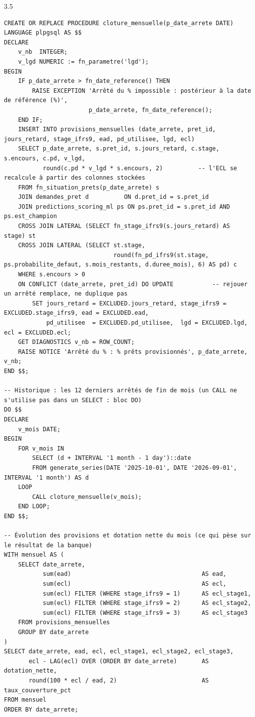 \begin{correction}{3.5}
\begin{lstlisting}[style=long]
CREATE OR REPLACE PROCEDURE cloture_mensuelle(p_date_arrete DATE)
LANGUAGE plpgsql AS $$
DECLARE
    v_nb  INTEGER;
    v_lgd NUMERIC := fn_parametre('lgd');
BEGIN
    IF p_date_arrete > fn_date_reference() THEN
        RAISE EXCEPTION 'Arrêté du % impossible : postérieur à la date de référence (%)',
                        p_date_arrete, fn_date_reference();
    END IF;
    INSERT INTO provisions_mensuelles (date_arrete, pret_id, jours_retard, stage_ifrs9, ead, pd_utilisee, lgd, ecl)
    SELECT p_date_arrete, s.pret_id, s.jours_retard, c.stage, s.encours, c.pd, v_lgd,
           round(c.pd * v_lgd * s.encours, 2)          -- l'ECL se recalcule à partir des colonnes stockées
    FROM fn_situation_prets(p_date_arrete) s
    JOIN demandes_pret d          ON d.pret_id = s.pret_id
    JOIN predictions_scoring_ml ps ON ps.pret_id = s.pret_id AND ps.est_champion
    CROSS JOIN LATERAL (SELECT fn_stage_ifrs9(s.jours_retard) AS stage) st
    CROSS JOIN LATERAL (SELECT st.stage,
                               round(fn_pd_ifrs9(st.stage, ps.probabilite_defaut, s.mois_restants, d.duree_mois), 6) AS pd) c
    WHERE s.encours > 0
    ON CONFLICT (date_arrete, pret_id) DO UPDATE           -- rejouer un arrêté remplace, ne duplique pas
        SET jours_retard = EXCLUDED.jours_retard, stage_ifrs9 = EXCLUDED.stage_ifrs9, ead = EXCLUDED.ead,
            pd_utilisee  = EXCLUDED.pd_utilisee,  lgd = EXCLUDED.lgd, ecl = EXCLUDED.ecl;
    GET DIAGNOSTICS v_nb = ROW_COUNT;
    RAISE NOTICE 'Arrêté du % : % prêts provisionnés', p_date_arrete, v_nb;
END $$;

-- Historique : les 12 derniers arrêtés de fin de mois (un CALL ne s'utilise pas dans un SELECT : bloc DO)
DO $$
DECLARE
    v_mois DATE;
BEGIN
    FOR v_mois IN
        SELECT (d + INTERVAL '1 month - 1 day')::date
        FROM generate_series(DATE '2025-10-01', DATE '2026-09-01', INTERVAL '1 month') AS d
    LOOP
        CALL cloture_mensuelle(v_mois);
    END LOOP;
END $$;

-- Évolution des provisions et dotation nette du mois (ce qui pèse sur le résultat de la banque)
WITH mensuel AS (
    SELECT date_arrete,
           sum(ead)                                     AS ead,
           sum(ecl)                                     AS ecl,
           sum(ecl) FILTER (WHERE stage_ifrs9 = 1)      AS ecl_stage1,
           sum(ecl) FILTER (WHERE stage_ifrs9 = 2)      AS ecl_stage2,
           sum(ecl) FILTER (WHERE stage_ifrs9 = 3)      AS ecl_stage3
    FROM provisions_mensuelles
    GROUP BY date_arrete
)
SELECT date_arrete, ead, ecl, ecl_stage1, ecl_stage2, ecl_stage3,
       ecl - LAG(ecl) OVER (ORDER BY date_arrete)       AS dotation_nette,
       round(100 * ecl / ead, 2)                        AS taux_couverture_pct
FROM mensuel
ORDER BY date_arrete;


\end{lstlisting}
\end{correction}
